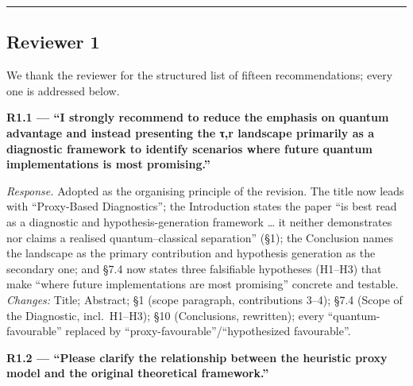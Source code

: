 \documentclass[
  11pt,
]{article}
\begin{document}
\begin{center}\rule{0.5\linewidth}{0.5pt}\end{center}

\subsection{Reviewer 1}\label{reviewer-1}

We thank the reviewer for the structured list of fifteen
recommendations; every one is addressed below.

\textbf{R1.1 --- ``I strongly recommend to reduce the emphasis on
quantum advantage and instead presenting the τ,r landscape primarily as
a diagnostic framework to identify scenarios where future quantum
implementations is most promising.''}

\emph{Response.} Adopted as the organising principle of the revision.
The title now leads with ``Proxy-Based Diagnostics''; the Introduction
states the paper ``is best read as a diagnostic and
hypothesis-generation framework \ldots{} it neither demonstrates nor
claims a realised quantum--classical separation'' (§1); the Conclusion
names the landscape as the primary contribution and hypothesis
generation as the secondary one; and §7.4 now states three falsifiable
hypotheses (H1--H3) that make ``where future implementations are most
promising'' concrete and testable. \emph{Changes:} Title; Abstract; §1
(scope paragraph, contributions 3--4); §7.4 (Scope of the Diagnostic,
incl.~H1--H3); §10 (Conclusions, rewritten); every
``quantum-favourable'' replaced by ``proxy-favourable''/``hypothesized
favourable''.

\textbf{R1.2 --- ``Please clarify the relationship between the heuristic
proxy model and the original theoretical framework.''}
\end{document}
